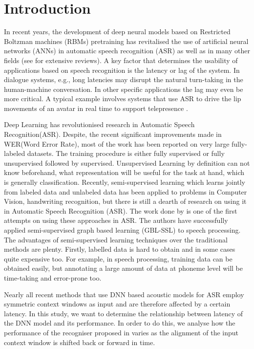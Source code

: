 \section{Introduction}
\label{sec:intro}
In recent years, the development of deep neural models based on Restricted Boltzman machines (RBMs) pretraining has revitalised the use of artificial neural networks (ANNs) in automatic speech recognition (ASR) as well as in many other fields (see \cite{LeCunEtAl2015Nature, Schmidhuber2015NeuralNetworks} for extensive reviews).
A key factor that determines the usability of applications based on speech recognition is the latency or lag of the system.
In dialogue systems, e.g., long latencies may disrupt the natural turn-taking in the human-machine conversation.
In other specific applications the lag may even be more critical.
A typical example involves systems that use ASR to drive the lip movements of an avatar in real time to support telepresence \cite{gs:SalviEtAl2009, MuEtAl2010LipSync, LiEtAl2013ICASSP}.

Deep Learning has revolutionised research in Automatic Speech Recognition(ASR). Despite, the recent significant improvements made in WER(Word Error Rate), most of the work has been reported on very large fully-labeled datasets. The training procedure is either fully supervised or fully unsupervised followed by supervised. Unsupervised Learning by definition can not know beforehand, what representation will be useful for the task at hand, which is generally classification. Recently, semi-supervised learning which learns jointly from labeled data and unlabeled data has been applied to problems in Computer Vision, handwriting recognition, but there is still a dearth of research on using it in Automatic Speech Recognition (ASR). The work done by \cite{liu2013, liu2014} is one of the first attempts on using these
approaches in ASR. The authors have successfully applied semi-supervised graph based learning (GBL-SSL) to speech processing. 
The advantages of semi-supervised learning techniques over the traditional methods are plenty. Firstly, labelled data is hard to obtain and in some cases quite expensive too. For example, in speech processing, training data can be obtained easily, but annotating a large amount of data at phoneme level will be time-taking and error-prone too. 



Nearly all recent methods that use DNN based acoustic models for ASR employ symmetric context windows as input \cite{Mohamed12, pdnn, dbn09, YaoEtAl2012SLTadaptation, DahlEtAl2011ICASSP} and are therefore affected by a certain latency.
In this study, we want to determine the relationship between latency of the DNN model and its performance.
In order to do this, we analyse how the performance of the recogniser proposed in \cite{pdnn} varies as the alignment of the input context window is shifted back or forward in time. 

